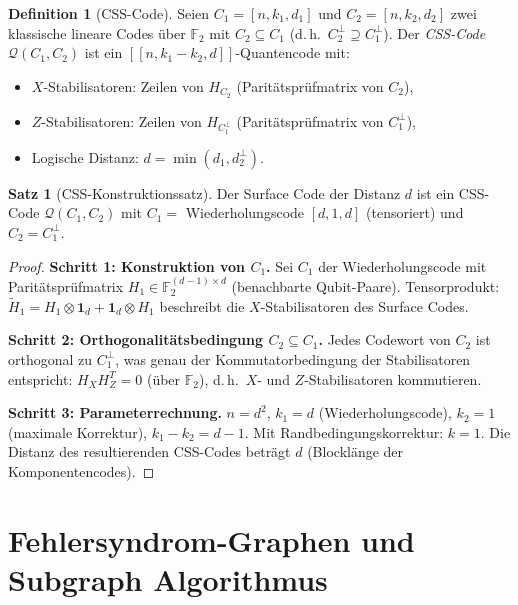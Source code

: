 ﻿\documentclass[a4paper,12pt]{article}
\theoremstyle{definition}
\newtheorem{definition}{Definition}
\newtheorem{satz}{Satz}
\begin{document}
\begin{definition}[CSS-Code]
\label{def:css}
Seien $C_1 = [n, k_1, d_1]$ und $C_2 = [n, k_2, d_2]$ zwei klassische
lineare Codes \"uber $\mathbb{F}_2$ mit $C_2 \subseteq C_1$ (d.\,h.\
$C_2^\perp \supseteq C_1^\perp$). Der \emph{CSS-Code}
$\mathcal{Q}(C_1, C_2)$ ist ein $[[n, k_1 - k_2, d]]$-Quantencode mit:
\begin{itemize}
    \item $X$-Stabilisatoren: Zeilen von $H_{C_2}$ (Parit\"atspr\"ufmatrix von $C_2$),
    \item $Z$-Stabilisatoren: Zeilen von $H_{C_1^\perp}$ (Parit\"atspr\"ufmatrix von $C_1^\perp$),
    \item Logische Distanz: $d = \min(d_1, d_2^\perp)$.
\end{itemize}
\end{definition}

\begin{satz}[CSS-Konstruktionssatz]
\label{satz:css}
Der Surface Code der Distanz $d$ ist ein CSS-Code
$\mathcal{Q}(C_1, C_2)$ mit $C_1 = $ Wiederholungscode $[d, 1, d]$
(tensoriert) und $C_2 = C_1^\perp$.
\end{satz}

\begin{proof}
\textbf{Schritt 1: Konstruktion von $C_1$.}
Sei $C_1$ der Wiederholungscode mit Parit\"atspr\"ufmatrix
$H_1 \in \mathbb{F}_2^{(d-1) \times d}$ (benachbarte Qubit-Paare).
Tensorprodukt: $\tilde{H}_1 = H_1 \otimes \mathbf{1}_d + \mathbf{1}_d \otimes H_1$
beschreibt die $X$-Stabilisatoren des Surface Codes.

\textbf{Schritt 2: Orthogonalitätsbedingung $C_2 \subseteq C_1$.}
Jedes Codewort von $C_2$ ist orthogonal zu $C_1^\perp$, was genau der
Kommutatorbedingung der Stabilisatoren entspricht:
$H_X H_Z^T = 0$ (\"uber $\mathbb{F}_2$), d.\,h.\ $X$- und $Z$-Stabilisatoren
kommutieren.

\textbf{Schritt 3: Parameterrechnung.}
$n = d^2$, $k_1 = d$ (Wiederholungscode), $k_2 = 1$ (maximale Korrektur),
$k_1 - k_2 = d - 1$. Mit Randbedingungskorrektur: $k = 1$. Die Distanz
des resultierenden CSS-Codes betr\"agt $d$ (Blocklänge der Komponentencodes).
\end{proof}

\section{Fehlersyndrom-Graphen und Subgraph Algorithmus}
\end{document}
